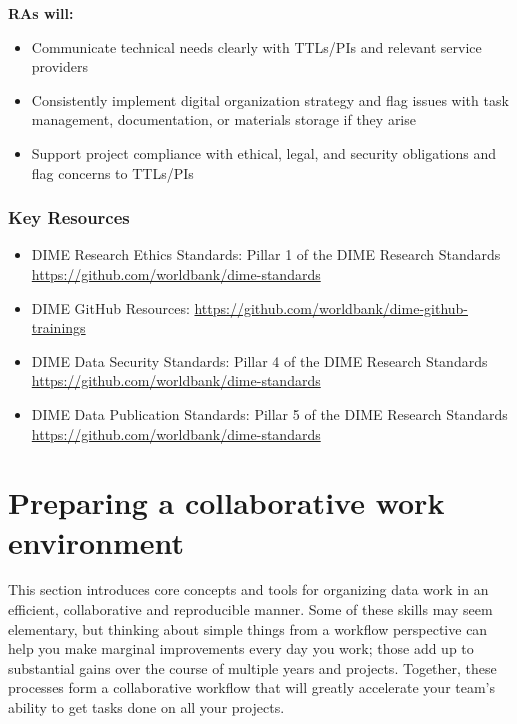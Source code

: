 \documentclass[
]{book}
\providecommand{\tightlist}{%
  \setlength{\itemsep}{0pt}\setlength{\parskip}{0pt}}
\begin{document}
\begin{summary}
\textbf{RAs will:}

\begin{itemize}
\tightlist
\item
  Communicate technical needs clearly with TTLs/PIs and relevant service providers
\item
  Consistently implement digital organization strategy and flag issues with task management, documentation, or materials storage if they arise
\item
  Support project compliance with ethical, legal, and security obligations and flag concerns to TTLs/PIs
\end{itemize}

\hypertarget{key-resources-1}{%
\subsubsection*{Key Resources}\label{key-resources-1}}

\begin{itemize}
\tightlist
\item
  DIME Research Ethics Standards: Pillar 1 of the DIME Research Standards \url{https://github.com/worldbank/dime-standards}
\item
  DIME GitHub Resources: \url{https://github.com/worldbank/dime-github-trainings}\\
\item
  DIME Data Security Standards: Pillar 4 of the DIME Research Standards \url{https://github.com/worldbank/dime-standards}
\item
  DIME Data Publication Standards: Pillar 5 of the DIME Research Standards \url{https://github.com/worldbank/dime-standards}
\end{itemize}
\end{summary}

\hypertarget{preparing-a-collaborative-work-environment}{%
\section*{Preparing a collaborative work environment}\label{preparing-a-collaborative-work-environment}}

This section introduces core concepts and tools
for organizing data work in an efficient, collaborative and reproducible manner.
Some of these skills may seem elementary,
but thinking about simple things from a workflow perspective
can help you make marginal improvements every day you work;
those add up to substantial gains over the course of multiple years and projects.
Together, these processes form a collaborative workflow
that will greatly accelerate your team's ability to get tasks done
on all your projects.
\end{document}
